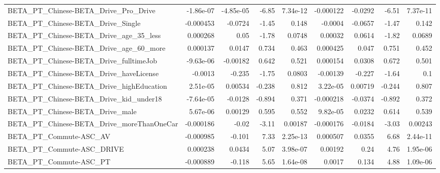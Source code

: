 \begin{tabular}{lrrrrrrrr}
BETA\_PT\_Chinese-BETA\_Drive\_Pro\_Drive               &   -1.86e-07 &    -4.85e-05 &     -6.85 & 7.34e-12 &  -0.000122 &     -0.0292 &        -6.51 &      7.37e-11 \\
BETA\_PT\_Chinese-BETA\_Drive\_Single                  &   -0.000453 &      -0.0724 &     -1.45 &    0.148 &    -0.0004 &     -0.0657 &        -1.47 &         0.142 \\
BETA\_PT\_Chinese-BETA\_Drive\_age\_35\_less             &    0.000268 &         0.05 &     -1.78 &   0.0748 &    0.00032 &      0.0614 &        -1.82 &        0.0689 \\
BETA\_PT\_Chinese-BETA\_Drive\_age\_60\_more             &    0.000137 &       0.0147 &     0.734 &    0.463 &   0.000425 &       0.047 &        0.751 &         0.452 \\
BETA\_PT\_Chinese-BETA\_Drive\_fulltimeJob             &   -9.63e-06 &     -0.00182 &     0.642 &    0.521 &   0.000154 &      0.0308 &        0.672 &         0.501 \\
BETA\_PT\_Chinese-BETA\_Drive\_haveLicense             &     -0.0013 &       -0.235 &     -1.75 &   0.0803 &   -0.00139 &      -0.227 &        -1.64 &           0.1 \\
BETA\_PT\_Chinese-BETA\_Drive\_highEducation           &    2.51e-05 &      0.00534 &    -0.238 &    0.812 &   3.22e-05 &     0.00719 &       -0.244 &         0.807 \\
BETA\_PT\_Chinese-BETA\_Drive\_kid\_under18             &   -7.64e-05 &      -0.0128 &    -0.894 &    0.371 &  -0.000218 &     -0.0374 &       -0.892 &         0.372 \\
BETA\_PT\_Chinese-BETA\_Drive\_male                    &    5.67e-06 &      0.00129 &     0.595 &    0.552 &   9.82e-05 &      0.0232 &        0.614 &         0.539 \\
BETA\_PT\_Chinese-BETA\_Drive\_moreThanOneCar          &   -0.000186 &        -0.02 &     -3.11 &  0.00187 &  -0.000176 &     -0.0184 &        -3.03 &       0.00243 \\
BETA\_PT\_Commute-ASC\_AV                             &   -0.000985 &       -0.101 &      7.33 & 2.25e-13 &   0.000507 &      0.0355 &         6.68 &      2.44e-11 \\
BETA\_PT\_Commute-ASC\_DRIVE                          &    0.000238 &       0.0434 &      5.07 & 3.98e-07 &    0.00192 &        0.24 &         4.76 &      1.95e-06 \\
BETA\_PT\_Commute-ASC\_PT                             &   -0.000889 &       -0.118 &      5.65 & 1.64e-08 &     0.0017 &       0.134 &         4.88 &      1.09e-06 \\

\end{tabular}
